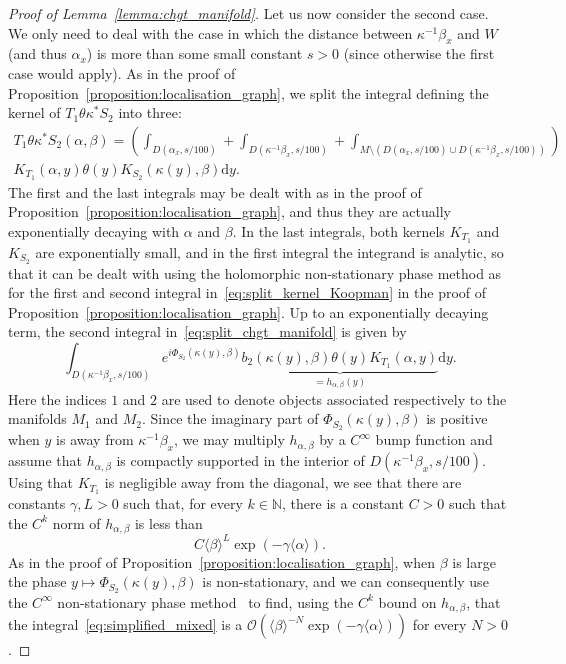 \documentclass[AHL,Unicode,longabstracts,published]{cedram}
\newcommand{\p}[1]{\left(#1\right)}
\newcommand{\brac}[1]{\langle #1 \rangle}
\newcommand{\clO}{\mathcal{O}}
\newcommand{\bbN}{\mathbb{N}}
\newcommand{\rmd}{\mathrm{d}}
\newcommand{\clO}{\mathcal{O}}
\begin{document}
\begin{proof}[Proof of Lemma~\ref{lemma:chgt_manifold}]
Let us now consider the second case. We only need to deal with the case in which the distance between $\kappa^{-1} \beta_x$ and $W$ (and thus $\alpha_x$) is more than some small constant $s > 0$ (since otherwise the first case would apply). As in the proof of Proposition~\ref{proposition:localisation_graph}, we split the integral defining the kernel of $T_1 \theta \kappa^* S_2$ into three:
\begin{multline}\label{eq:split_chgt_manifold}
 T_1 \theta \kappa^* S_2(\alpha,\beta)
 = \p{\int_{D(\alpha_x,s/100)} + \int_{D\left(\kappa^{-1} \beta_x,s/100\right)} + \int_{M \setminus \left(D(\alpha_x,s/100) \cup D\left(\kappa^{-1} \beta_x,s/100\right)\right)}} \\
K_{T_1}(\alpha,y) \theta(y) K_{S_2}(\kappa (y), \beta) \rmd y.
\end{multline}
The first and the last integrals may be dealt with as in the proof of Proposition~\ref{proposition:localisation_graph}, and thus they are actually exponentially decaying with $\alpha$ and $\beta$. In the last integrals, both kernels $K_{T_1}$ and $K_{S_2}$ are exponentially small, and in the first integral the integrand is analytic, so that it can be dealt with using the holomorphic non-stationary phase method as for the first and second integral in~\eqref{eq:split_kernel_Koopman} in the proof of Proposition~\ref{proposition:localisation_graph}. Up to an exponentially decaying term, the second integral in~\eqref{eq:split_chgt_manifold} is given by
\begin{equation}\label{eq:simplified_mixed}
\int_{D\left(\kappa^{-1} \beta_x,s/100\right)} e^{i \Phi_{S_2}(\kappa(y),\beta)} \underbrace{b_2(\kappa (y), \beta) \theta(y) K_{T_1}(\alpha,y)}_{= h_{\alpha,\beta}(y)} \rmd y.
\end{equation}
Here the indices $1$ and $2$ are used to denote objects associated respectively to the manifolds $M_1$ and $M_2$. Since the imaginary part of $\Phi_{S_2}(\kappa(y),\beta)$ is positive when $y$ is away from $\kappa^{-1}
\beta_x$, we may multiply $h_{\alpha,\beta}$ by a $C^\infty$ bump function and assume that $h_{\alpha,\beta}$ is compactly supported in the interior of $D(\kappa^{-1} \beta_x,s/100)$. Using that $K_{T_1}$ is negligible away from the diagonal, we see that there are constants $\gamma,L > 0$ such that, for every $k \in \bbN$, there is a constant $C > 0$ such that the $C^k$ norm of $h_{\alpha,\beta}$ is less than
\begin{equation*}
C \brac{\beta}^L \exp\p{ - \gamma \brac{\alpha}}.
\end{equation*}
As in the proof of Proposition~\ref{proposition:localisation_graph}, when $\beta$ is large the phase $y\mapsto \Phi_{S_2}(\kappa (y), \beta)$ is non-stationary, and we can consequently use the $C^\infty$ non-stationary phase method~\cite[Theorem~7.7.1]{hormander_book_1} to find, using the $C^k$ bound on $h_{\alpha,\beta}$, that the integral~\eqref{eq:simplified_mixed} is a $\clO\p{\brac{\beta}^{-N} \exp\p{- \gamma \brac{\alpha}}}$ for every $N > 0$.


\end{proof}
\end{document}
